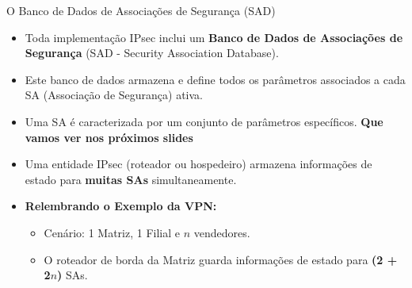 \begin{frame}{O Banco de Dados de Associações de Segurança (SAD)}
    \begin{itemize}
        \item Toda implementação IPsec inclui um \textbf{Banco de Dados de Associações de Segurança} (SAD - Security Association Database).

        \item Este banco de dados armazena e define todos os parâmetros associados a cada SA (Associação de Segurança) ativa.

        \item Uma SA é caracterizada por um conjunto de parâmetros específicos. \textbf{Que vamos ver nos próximos slides}

        \item Uma entidade IPsec (roteador ou hospedeiro) armazena informações de estado para \textbf{muitas SAs} simultaneamente.

        \item \textbf{Relembrando o Exemplo da VPN:}
              \begin{itemize}
                  \item Cenário: 1 Matriz, 1 Filial e $n$ vendedores.
                  \item O roteador de borda da Matriz guarda informações de estado para \textbf{(2 + 2$n$)} SAs.
              \end{itemize}
    \end{itemize}


\end{frame}

